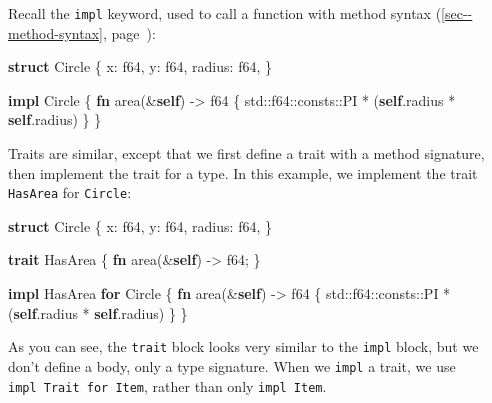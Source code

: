 \documentclass[a4paper,]{book}
\renewcommand*{\hyperlink}[2]{%
 #2 (\autoref{#1}, page~\pageref{#1})}
\newenvironment{Shaded}{\begin{snugshade}}{\end{snugshade}}
\newcommand{\KeywordTok}[1]{\textcolor[rgb]{0.13,0.29,0.53}{\textbf{{#1}}}}
\newcommand{\DataTypeTok}[1]{\textcolor[rgb]{0.13,0.29,0.53}{{#1}}}
\newcommand{\NormalTok}[1]{{#1}}
\begin{document}
Recall the \texttt{impl} keyword, used to call a function with
\protect\hyperlink{sec--method-syntax}{method syntax}:

\begin{Shaded}
\begin{Highlighting}[]
\KeywordTok{struct} \NormalTok{Circle \{}
    \NormalTok{x: }\DataTypeTok{f64}\NormalTok{,}
    \NormalTok{y: }\DataTypeTok{f64}\NormalTok{,}
    \NormalTok{radius: }\DataTypeTok{f64}\NormalTok{,}
\NormalTok{\}}

\KeywordTok{impl} \NormalTok{Circle \{}
    \KeywordTok{fn} \NormalTok{area(&}\KeywordTok{self}\NormalTok{) -> }\DataTypeTok{f64} \NormalTok{\{}
        \NormalTok{std::}\DataTypeTok{f64}\NormalTok{::consts::PI * (}\KeywordTok{self}\NormalTok{.radius * }\KeywordTok{self}\NormalTok{.radius)}
    \NormalTok{\}}
\NormalTok{\}}
\end{Highlighting}
\end{Shaded}

Traits are similar, except that we first define a trait with a method
signature, then implement the trait for a type. In this example, we
implement the trait \texttt{HasArea} for \texttt{Circle}:

\begin{Shaded}
\begin{Highlighting}[]
\KeywordTok{struct} \NormalTok{Circle \{}
    \NormalTok{x: }\DataTypeTok{f64}\NormalTok{,}
    \NormalTok{y: }\DataTypeTok{f64}\NormalTok{,}
    \NormalTok{radius: }\DataTypeTok{f64}\NormalTok{,}
\NormalTok{\}}

\KeywordTok{trait} \NormalTok{HasArea \{}
    \KeywordTok{fn} \NormalTok{area(&}\KeywordTok{self}\NormalTok{) -> }\DataTypeTok{f64}\NormalTok{;}
\NormalTok{\}}

\KeywordTok{impl} \NormalTok{HasArea }\KeywordTok{for} \NormalTok{Circle \{}
    \KeywordTok{fn} \NormalTok{area(&}\KeywordTok{self}\NormalTok{) -> }\DataTypeTok{f64} \NormalTok{\{}
        \NormalTok{std::}\DataTypeTok{f64}\NormalTok{::consts::PI * (}\KeywordTok{self}\NormalTok{.radius * }\KeywordTok{self}\NormalTok{.radius)}
    \NormalTok{\}}
\NormalTok{\}}
\end{Highlighting}
\end{Shaded}

As you can see, the \texttt{trait} block looks very similar to the
\texttt{impl} block, but we don't define a body, only a type signature.
When we \texttt{impl} a trait, we use \texttt{impl\ Trait\ for\ Item},
rather than only \texttt{impl\ Item}.
\end{document}

